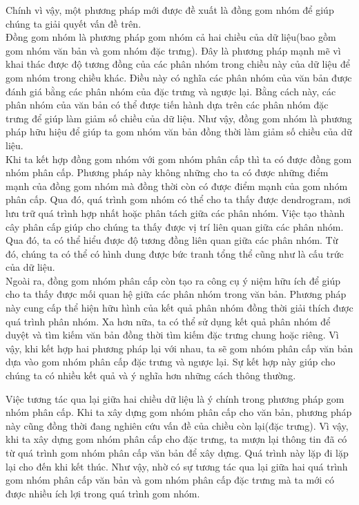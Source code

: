 Chính vì vậy, một phương pháp mới được đề xuất là đồng gom nhóm để giúp chúng ta giải quyết vấn đề trên.\\
\hspace*{10mm}Đồng gom nhóm là phương pháp gom nhóm cả hai chiều của dữ liệu(bao gồm gom nhóm văn bản và gom nhóm đặc trưng). Đây là phương pháp mạnh mẽ vì khai thác được độ tương đồng của các phân nhóm trong chiều này của dữ liệu để gom nhóm trong chiều khác. Điều này có nghĩa các phân nhóm của văn bản được đánh giá bằng các phân nhóm của đặc trưng và ngược lại. Bằng cách này, các phân nhóm của văn bản có thể được tiến hành dựa trên các phân nhóm đặc trưng để giúp làm giảm số chiều của dữ liệu. Như vậy, đồng gom nhóm là phương pháp hữu hiệu để giúp ta gom nhóm văn bản đồng thời làm giảm số chiều của dữ liệu.\\

\hspace*{10mm}Khi ta kết hợp đồng gom nhóm với gom nhóm phân cấp thì ta có được đồng gom nhóm phân cấp. Phương pháp này không những cho ta có được những điểm mạnh của đồng gom nhóm mà đồng thời còn có được điểm  mạnh của gom nhóm phân cấp. Qua đó, quá trình gom nhóm có thể cho ta thấy được dendrogram, nơi lưu trữ quá trình hợp nhất hoặc phân tách giữa các phân nhóm. Việc tạo thành cây phân cấp giúp cho chúng ta thấy được vị trí liên quan giữa các phân nhóm. Qua đó, ta có thể hiểu được độ tương đồng liên quan giữa các phân nhóm. Từ đó, chúng ta có thể có hình dung được bức tranh tổng thể cũng như là cấu trức của dữ liệu.\\

Ngoài ra, đồng gom nhóm phân cấp còn tạo ra công cụ ý niệm hữu ích để giúp cho ta thấy được mối quan hệ giữa các phân nhóm trong văn bản. 
Phương pháp này cung cấp thể hiện hữu hình của kết quả phân nhóm đồng thời giải thích được quá trình phân nhóm. 
Xa hơn nữa, ta có thể sử dụng kết quả phân nhóm để duyệt và tìm kiếm văn bản đồng thời tìm kiếm đặc trưng chung hoặc riêng. 
Vì vậy, khi kết hợp hai phương pháp lại với nhau, ta sẽ gom nhóm phân cấp văn bản dựa vào gom nhóm phân cấp đặc trưng và ngược lại. 
Sự kết hợp này giúp cho chúng ta có nhiều kết quả và ý nghĩa hơn những cách thông thường.

Việc tương tác qua lại giữa hai chiều dữ liệu là ý chính trong phương pháp gom nhóm phân cấp. Khi ta xây dựng gom nhóm phân cấp cho văn bản, phương pháp này cũng đồng thời đang nghiên cứu vấn đề của chiều còn lại(đặc trưng). Vì vậy, khi ta xây dựng gom nhóm phân cấp cho đặc trưng, ta mượn lại thông tin đã có từ quá trình gom nhóm phân cấp văn bản để xây dựng. Quá trình này lặp đi lặp lại cho đến khi kết thúc. Như vậy, nhờ có sự tương tác qua lại giữa hai quá trình gom nhóm phân cấp văn bản và gom nhóm phân cấp đặc trưng mà ta mới có được nhiều ích lợi trong quá trình gom nhóm.\\


